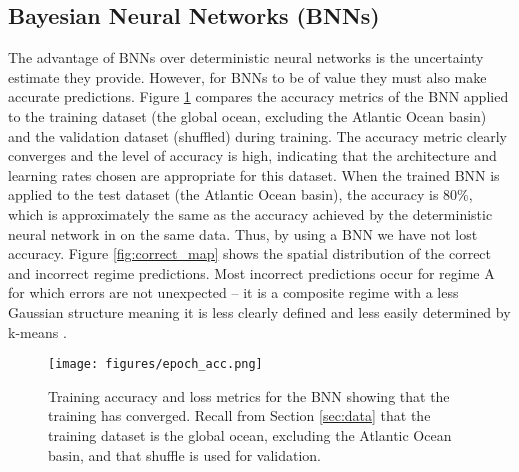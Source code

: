 \documentclass[a4paper]{article}
\begin{document}
\subsection{Bayesian Neural Networks (BNNs)}\label{subsec:results_bnn}
The advantage of BNNs over deterministic neural networks is the uncertainty estimate they provide. However, for BNNs to be of value they must also make accurate predictions. Figure \ref{fig:training} compares the accuracy metrics of the BNN applied to the training dataset (the global ocean, excluding the Atlantic Ocean basin) and the validation dataset (shuffled) during training. The accuracy metric clearly converges and the level of accuracy is high,  indicating that the architecture and learning rates chosen are appropriate for this dataset. When the trained BNN is applied to the test dataset (the Atlantic Ocean basin), the accuracy is 80\%, which is approximately the same as the accuracy achieved by the deterministic neural network in \cite{THOR} on the same data. Thus, by using a BNN we have not lost accuracy. Figure \ref{fig:correct_map} shows the spatial distribution of the correct and incorrect regime predictions. Most incorrect predictions occur for regime A for which errors are not unexpected -- it is a composite regime with a less Gaussian structure meaning it is less clearly defined and less easily determined by k-means \citep{sonnewald2019unsupervised}.

\begin{figure}
    \centering
    \texttt{[image: figures/epoch\_acc.png]}
\caption{Training accuracy and loss metrics for the BNN showing that the training has converged. Recall from Section \ref{sec:data} that the training dataset is the global ocean, excluding the Atlantic Ocean basin, and that shuffle is used for validation.}\label{fig:training}
\end{figure}
\end{document}
